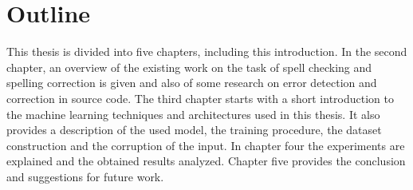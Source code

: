 \section{Outline}

This thesis is divided into five chapters, including this introduction. In the second chapter, an overview of the existing work on the task of spell checking and spelling correction is given and also of some research on error detection and correction in source code. The third chapter starts with a short introduction to the machine learning techniques and architectures used in this thesis. It also provides a description of the used model, the training procedure, the dataset construction and the corruption of the input. In chapter four the experiments are explained and the obtained results analyzed. Chapter five provides the conclusion and suggestions for future work.
